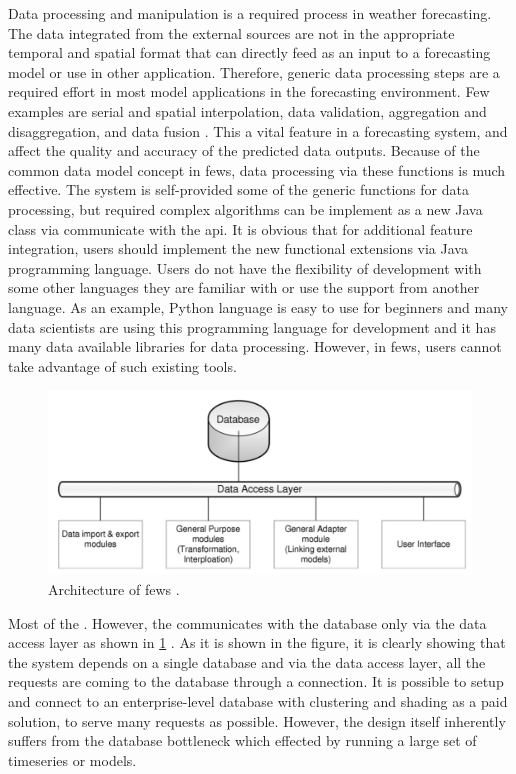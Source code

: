 Data processing and manipulation is a required process in weather forecasting. 
The data integrated from the external sources are not in the appropriate temporal and spatial format that can directly feed as an input to a forecasting model or use in other application. Therefore, generic data processing steps are a required effort in most model applications in the forecasting environment. Few examples are serial and spatial interpolation, data validation, aggregation and disaggregation, and data fusion \cite{Werner2013TheSystem}. This a vital feature in a forecasting system, and affect the quality and accuracy of the predicted data outputs. Because of the common data model concept in \acrshort{fews}, data processing via these functions is much effective. The system is self-provided some of the generic functions for data processing, but required complex algorithms can be implement as a new Java class via communicate with the \acrfull{api}. It is obvious that for additional feature integration, users should implement the new functional extensions via Java programming language. Users do not have the flexibility of development with some other languages they are familiar with or use the support from another language. As an example, Python language is easy to use for beginners and many data scientists are using this programming language for development and it has many data available libraries for data processing. However, in \acrshort{fews}, users cannot take advantage of such existing tools.

\begin{figure}[htp]
    \centering
    \includegraphics[width=1.0\textwidth]{lit/fews/Architecture-of-Delft-FEWS-showing-the-data-base-the-data-access-layers-and-examples-of_W640.png}
    \caption[Architecture of \acrshort{fews}]{Architecture of \acrshort{fews} \cite{Werner2013TheSystem}.}
    \label{fi:fews_data_layer}
\end{figure}
Most of the . However, the communicates with the database only via the data access layer as shown in \cref{fi:fews_data_layer} \cite{Werner2013TheSystem}. As it is shown in the figure, it is clearly showing that the system depends on a single database and via the data access layer, all the requests are coming to the database through a connection. It is possible to setup and connect to an enterprise-level database with clustering and shading as a paid solution, to serve many requests as possible. However, the design itself inherently suffers from the database bottleneck which effected by running a large set of timeseries or models.


